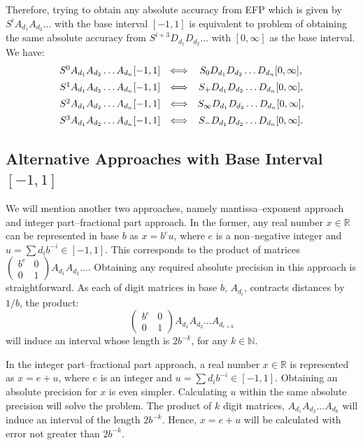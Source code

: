 \documentclass[11pt,a4paper]{article}
\begin{document}
Therefore, trying to obtain any absolute accuracy from EFP which is given
	by $S^i A_{d_1} A_{d_2} \ldots$ with the base interval $[-1,1]$ is
	equivalent to problem of obtaining the same absolute accuracy from
	$S^{i+3} D_{d_1} D_{d_2} \ldots$ with $[0,\infty]$ as the base interval.
	We have:
	\[ \begin{array}{ccc}
		S^0 A_{d_1} A_{d_2} \ldots A_{d_n} [-1,1] &\Longleftrightarrow&
			S_0 D_{d_1} D_{d_2} \ldots D_{d_n} [0,\infty], \vspace{0.5em} \\
		S^1 A_{d_1} A_{d_2} \ldots A_{d_n} [-1,1] &\Longleftrightarrow&
			S_+ D_{d_1} D_{d_2} \ldots D_{d_n} [0,\infty], \vspace{0.5em} \\
		S^2 A_{d_1} A_{d_2} \ldots A_{d_n} [-1,1] &\Longleftrightarrow&
			S_\infty D_{d_1} D_{d_2} \ldots D_{d_n} [0,\infty], \vspace{0.5em} \\
		S^3 A_{d_1} A_{d_2} \ldots A_{d_n} [-1,1] &\Longleftrightarrow&
			S_- D_{d_1} D_{d_2} \ldots D_{d_n} [0,\infty].
	\end{array} \]


\subsection{Alternative Approaches with Base Interval $[-1,1]$}
We will mention another two approaches, namely {\sc mantissa--exponent
	approach} and {\sc integer part--fractional part approach}. In the
	former, any real number $x \in \mathbb{R}$ can be represented in base
	$b$ as $x=b^e u$, where $e$ is a non--negative integer and $u =
	\sum d_i b^{-i} \in [-1,1]$. This corresponds to the product of matrices
	$\begin{pmatrix} b^e&0 \\ 0&1 \end{pmatrix} A_{d_1} A_{d_2} \ldots$.
	Obtaining any required absolute precision in this approach is
	straightforward. As each of digit matrices in base $b$, $A_{d_i}$,
	contracts distances by $1/b$, the product:
	\[ \begin{pmatrix} b^e&0 \\ 0&1 \end{pmatrix} A_{d_1} A_{d_2} \ldots
		A_{d_{e+k}} \]
	will induce an interval whose length is $2b^{-k}$, for any $k \in
	\mathbb{N}$.

In the integer part--fractional part approach, a real number $x \in
	\mathbb{R}$ is represented as $x=e+u$, where $e$ is an integer and
	$u = \sum d_i b^{-i} \in [-1,1]$. Obtaining an absolute precision for $x$
	is even simpler. Calculating $u$ within the same absolute precision will
	solve the problem. The product of $k$ digit matrices, $A_{d_1} A_{d_2}
	\ldots A_{d_k}$ will induce an interval of the length $2b^{-k}$. Hence,
	$x=e+u$ will be calculated with error not greater than $2b^{-k}$.
\end{document}
